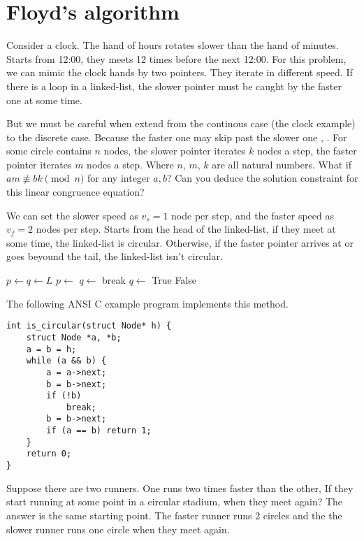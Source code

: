 \documentclass{article}
\begin{document}
\section{Floyd's algorithm}

Consider a clock. The hand of hours rotates slower than the hand of minutes. Starts
from 12:00, they meets 12 times before the next 12:00. For this problem,
we can mimic the clock hands by two pointers. They iterate in different speed.
If there is a loop in a linked-list, the slower pointer must be caught by the faster
one at some time.

But we must be careful when extend from the continous case (the clock example) to
the discrete case. Because the faster one may skip past the slower one \cite{Stepanov09}, \cite{TAOCP2}.
For some circle contains $n$ nodes, the
slower pointer iterates $k$ nodes a step, the faster pointer iterates $m$ nodes a step.
Where $n$, $m$, $k$ are all natural numbers. What if $am \not\equiv bk \pmod n$ for
any integer $a, b$? Can you deduce the solution constraint for this linear congruence equation?

We can set the slower speed as $v_s = 1$ node per step,
and the faster speed as $v_f = 2$ nodes per step. Starts from the head of the linked-list, if they
meet at some time, the linked-list is circular. Otherwise, if the faster pointer
arrives at or goes beyound the tail, the linked-list isn't circular.

\begin{algorithmic}[1]
  \State $p \gets q \gets L$
    \State $p \gets$ 
    \State $q \gets$ 
      \State break
    \EndIf
    \State $q \gets$ 
      \State \Return True
    \EndIf
  \EndWhile
  \State \Return False
\EndFunction
\end{algorithmic}

The following ANSI C example program implements this method.

\lstset{language=C}
\begin{lstlisting}
int is_circular(struct Node* h) {
    struct Node *a, *b;
    a = b = h;
    while (a && b) {
        a = a->next;
        b = b->next;
        if (!b)
            break;
        b = b->next;
        if (a == b) return 1;
    }
    return 0;
}
\end{lstlisting}

Suppose there are two runners. One runs two times faster than the other, If they start
running at some point in a circular stadium, when they meet again? The answer is the
same starting point. The faster runner runs 2 circles and the the slower runner runs
one circle when they meet again.
\end{document}
